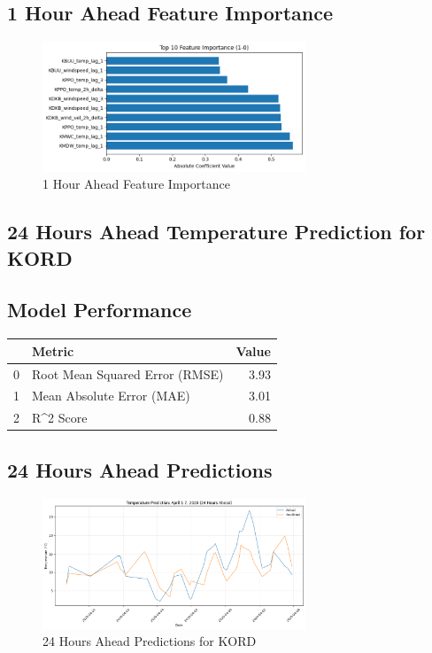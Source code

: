 \subsection{1 Hour Ahead Feature Importance}
\begin{figure}[htbp]
\centering
\includegraphics[width=0.7\textwidth]{1-0-linear_temp_shift_feature_importance.png}
\caption{1 Hour Ahead Feature Importance}
\label{fig:1_hour_ahead_featimp}
\end{figure}



\subsection{24 Hours Ahead Temperature Prediction for KORD}
\subsection{Model Performance}
\begin{tabular}{llr}
\toprule
 & Metric & Value \\
\midrule
0 & Root Mean Squared Error (RMSE) & 3.93 \\
1 & Mean Absolute Error (MAE) & 3.01 \\
2 & R^2 Score & 0.88 \\
\bottomrule
\end{tabular}

\subsection{24 Hours Ahead Predictions}
\begin{figure}[htbp]
\centering
\includegraphics[width=0.7\textwidth]{1-1-linear_temp_shift_results.png}
\caption{24 Hours Ahead Predictions for KORD}
\label{fig:24_hours_ahead_pred}
\end{figure}

